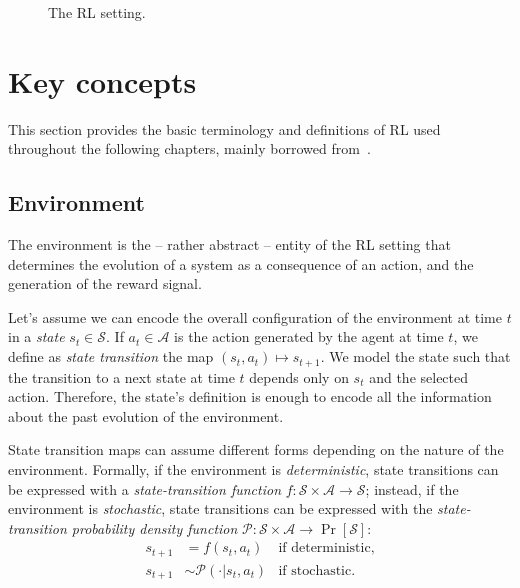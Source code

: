 \begin{figure}
    \centering
    \caption{The \acl{RL} setting.}
    \label{fig:rl_setting}
\end{figure}

\section{Key concepts}
\label{section:key_concepts}

This section provides the basic terminology and definitions of \ac{RL} used throughout the following chapters, mainly borrowed from~\parencite{sutton_reinforcement_2018, achiam_spinning_2018, dong_deep_2020}.

\subsection{Environment}

The environment is the -- rather abstract -- entity of the \ac{RL} setting that determines the evolution of a system as a consequence of an action, and the generation of the reward signal.

Let's assume we can encode the overall configuration of the environment at time $t$ in a \emph{state} $s_t \in \mathcal{S}$.
If $a_t \in \mathcal{A}$ is the action generated by the agent at time $t$, we define as \emph{state transition} the map $(s_t, a_t) \mapsto s_{t+1}$.
We model the state such that the transition to a next state at time $t$ depends only on $s_t$ and the selected action.
Therefore, the state's definition is enough to encode all the information about the past evolution of the environment.

State transition maps can assume different forms depending on the nature of the environment.
Formally, if the environment is \emph{deterministic}, state transitions can be expressed with a \emph{state-transition function} $f: \mathcal{S} \times \mathcal{A} \to \mathcal{S}$; instead, if the environment is \emph{stochastic}, state transitions can be expressed with the \emph{state-transition probability density function} $\mathcal{P}: \mathcal{S} \times \mathcal{A} \to \operatorname{Pr}[\mathcal{S}]$:
%
\begin{equation}
\label{eq:state_transition_equations}
\begin{aligned}
    s_{t+1} &= f(s_t, a_t) &\text{if deterministic,}\\
    s_{t+1} &\sim \mathcal{P}(\cdot|s_t, a_t) &\text{if stochastic.}
\end{aligned}
\end{equation}

